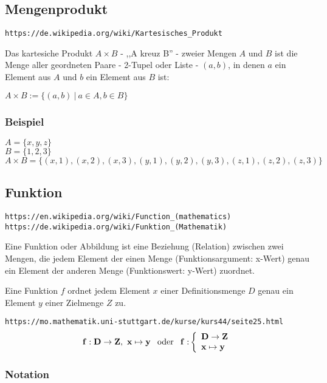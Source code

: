 \documentclass[10pt,a4paper]{article}
\begin{document}
\subsection {Mengenprodukt}

\verb+https://de.wikipedia.org/wiki/Kartesisches_Produkt+
\vskip 8pt

Das kartesiche Produkt $A \times B$ - ,,A kreuz B'' - zweier Mengen $A$ und $B$
ist die Menge aller geordneten Paare - 2-Tupel oder Liste - $(a, b)$, in denen $a$
ein Element aus $A$ und $b$ ein Element aus $B$ ist:
\vskip 8pt

$A \times B := \{ (a, b)\ |\ a \in A, b \in B \}$


\subsubsection{Beispiel}

$A = \{x, y, z\}$ \\
$B = \{1, 2, 3\}$ \\
$A \times B = \{ (x, 1), (x, 2), (x, 3), (y, 1), (y, 2), (y, 3), (z, 1), (z, 2), (z, 3) \}$


\subsection {Funktion}

\verb+https://en.wikipedia.org/wiki/Function_(mathematics)+ \\
\verb+https://de.wikipedia.org/wiki/Funktion_(Mathematik)+
\vskip 8pt

Eine Funktion oder Abbildung ist eine Beziehung (Relation) zwischen zwei Mengen,
die jedem Element der einen Menge (Funktionsargument: x-Wert) genau ein Element
der anderen Menge (Funktionswert: y-Wert) zuordnet.

\vskip 8pt
Eine Funktion $f$ ordnet jedem Element $x$ einer Definitionsmenge $D$ genau ein
Element $y$ einer Zielmenge $Z$ zu.

\vskip 8pt
\verb+https://mo.mathematik.uni-stuttgart.de/kurse/kurs44/seite25.html+
\vskip 8pt
  \[
  {\bf f: D \rightarrow Z,\ x \mapsto y \hskip 8pt} {\rm oder} \hskip 8pt {\bf f:}
  \left\{%
    \begin{array}{ll}
      {\bf D \rightarrow Z} \\
      {\bf x \mapsto y}
    \end{array}
  \right.
  \]

    
\subsubsection {Notation}
\end{document}
